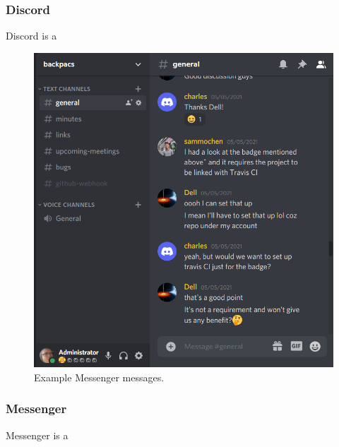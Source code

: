 \documentclass[conference]{IEEEtran}
\begin{document}
\subsubsection{Discord}
Discord is a 


\begin{figure}[htbp]
\centerline{\includegraphics[width = \linewidth]{discord.png}}
\caption{Example Messenger messages.}
\label{fig}
\end{figure}
\subsubsection{Messenger}
Messenger is a 
\end{document}
